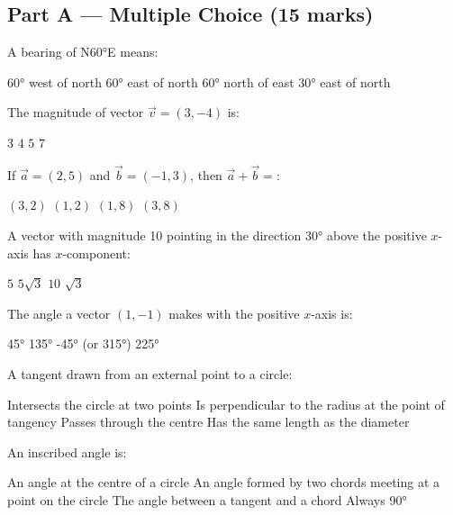 \documentclass[addpoints]{exam}
\begin{document}
\newpage
\begin{questions}

\section*{Part A --- Multiple Choice (15 marks)}
\vspace{5mm}

\question[1] A bearing of N\ang{60}E means:
\begin{choices}
    \choice \ang{60} west of north
    \correctchoice \ang{60} east of north
    \choice \ang{60} north of east
    \choice \ang{30} east of north
\end{choices}

\question[1] The magnitude of vector $\vec{v} = (3, -4)$ is:
\begin{choices}
    \choice $3$
    \choice $4$
    \correctchoice $5$
    \choice $7$
\end{choices}

\question[1] If $\vec{a} = (2, 5)$ and $\vec{b} = (-1, 3)$, then $\vec{a} + \vec{b} =$:
\begin{choices}
    \choice $(3, 2)$
    \choice $(1, 2)$
    \correctchoice $(1, 8)$
    \choice $(3, 8)$
\end{choices}

\question[1] A vector with magnitude 10 pointing in the direction \ang{30} above the positive
$x$-axis has $x$-component:
\begin{choices}
    \choice $5$
    \correctchoice $5\sqrt{3}$
    \choice $10$
    \choice $\sqrt{3}$
\end{choices}

\question[1] The angle a vector $(1, -1)$ makes with the positive $x$-axis is:
\begin{choices}
    \choice \ang{45}
    \choice \ang{135}
    \correctchoice \ang{-45} (or \ang{315})
    \choice \ang{225}
\end{choices}

\question[1] A tangent drawn from an external point to a circle:
\begin{choices}
    \choice Intersects the circle at two points
    \correctchoice Is perpendicular to the radius at the point of tangency
    \choice Passes through the centre
    \choice Has the same length as the diameter
\end{choices}

\question[1] An inscribed angle is:
\begin{choices}
    \choice An angle at the centre of a circle
    \correctchoice An angle formed by two chords meeting at a point on the circle
    \choice The angle between a tangent and a chord
    \choice Always \ang{90}
\end{choices}


\end{questions}
\end{document}
